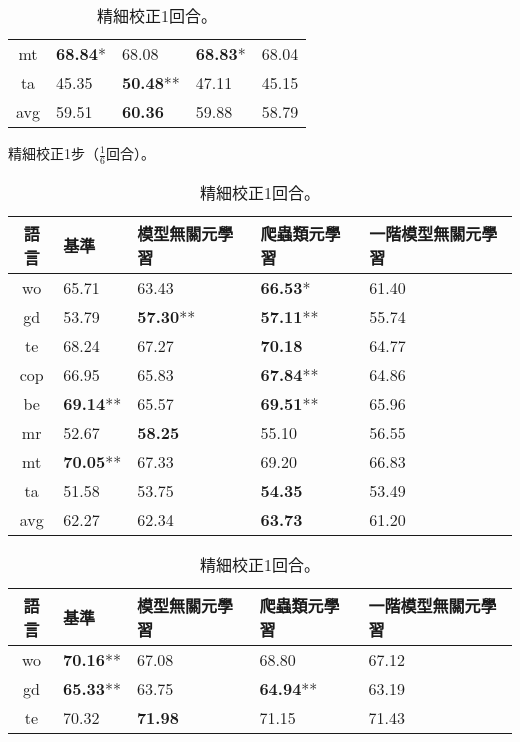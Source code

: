 \begin{table}[htbp]
\begin{subtable}[h]{0.8\textwidth}
\begin{tabular}[!ht]{c|llll}
                mt & \textbf{68.84}* & 68.08 & \textbf{68.83}* & 68.04 \\
                ta & 45.35 & \textbf{50.48}** & 47.11 & 45.15 \\
                \hline
                avg & 59.51 & \textbf{60.36} & 59.88 & 58.79 \\
                \hline
            \end{tabular}
        \caption{精細校正1步（$\frac{1}{6}$回合）。}
    \end{subtable}
    \vfill
    \begin{subtable}[h]{0.8\textwidth}
    \centering
        \begin{tabular}[!ht]{c|llll}
            \hline
            語言 & 基準 & 模型無關元學習 & 爬蟲類元學習 & 一階模型無關元學習 \\
            \hline\hline
            wo & 65.71 & 63.43 & \textbf{66.53}* & 61.40 \\
            gd & 53.79 & \textbf{57.30}** & \textbf{57.11}** & 55.74 \\
            te & 68.24 & 67.27 & \textbf{70.18} & 64.77 \\
            cop & 66.95 & 65.83 & \textbf{67.84}** & 64.86 \\
            be & \textbf{69.14}** & 65.57 & \textbf{69.51}** & 65.96 \\
            mr & 52.67 & \textbf{58.25} & 55.10 & 56.55 \\
            mt & \textbf{70.05}** & 67.33 & 69.20 & 66.83 \\
            ta & 51.58 & 53.75 & \textbf{54.35} & 53.49 \\
            \hline
            avg & 62.27 & 62.34 & \textbf{63.73} & 61.20 \\
            \hline
        \end{tabular}
        \caption{精細校正1回合。}
    \end{subtable}
    \vfill
    \begin{subtable}[h]{0.8\textwidth}
        \centering
            \begin{tabular}[!ht]{c|llll}
                \hline
                語言 & 基準 & 模型無關元學習 & 爬蟲類元學習 & 一階模型無關元學習 \\
                \hline\hline
                wo & \textbf{70.16}** & 67.08 & 68.80 & 67.12 \\
                gd & \textbf{65.33}** & 63.75 & \textbf{64.94}** & 63.19 \\
                te & 70.32 & \textbf{71.98} & 71.15 & 71.43 \\

\end{tabular}
\end{subtable}
\end{table}
